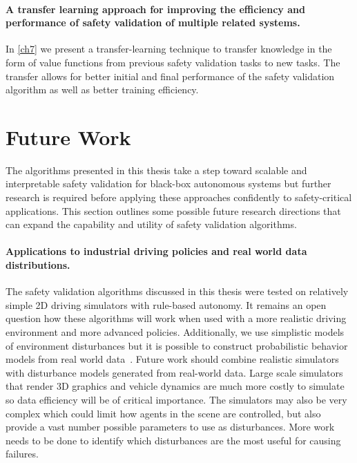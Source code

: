 \paragraph{A transfer learning approach for improving the efficiency and performance of safety validation of multiple related systems.} In \cref{ch7} we present a transfer-learning technique to transfer knowledge in the form of value functions from previous safety validation tasks to new tasks. The transfer allows for better initial and final performance of the safety validation algorithm as well as better training efficiency. 

\section{Future Work}
The algorithms presented in this thesis take a step toward scalable and interpretable safety validation for black-box autonomous systems but further research is required before applying these approaches confidently to safety-critical applications. This section outlines some possible future research directions that can expand the capability and utility of safety validation algorithms. 

\paragraph{Applications to industrial driving policies and real world data distributions.} The safety validation algorithms discussed in this thesis were tested on relatively simple 2D driving simulators with rule-based autonomy. It remains an open question how these algorithms will work when used with a more realistic driving environment and more advanced policies. Additionally, we use simplistic models of environment disturbances but it is possible to construct probabilistic behavior models from real world data~\cite{ellis2009modelling}. Future work should combine realistic simulators with disturbance models generated from real-world data. Large scale simulators that render 3D graphics and vehicle dynamics are much more costly to simulate so data efficiency will be of critical importance. The simulators may also be very complex which could limit how agents in the scene are controlled, but also provide a vast number possible parameters to use as disturbances. More work needs to be done to identify which disturbances are the most useful for causing failures. 

